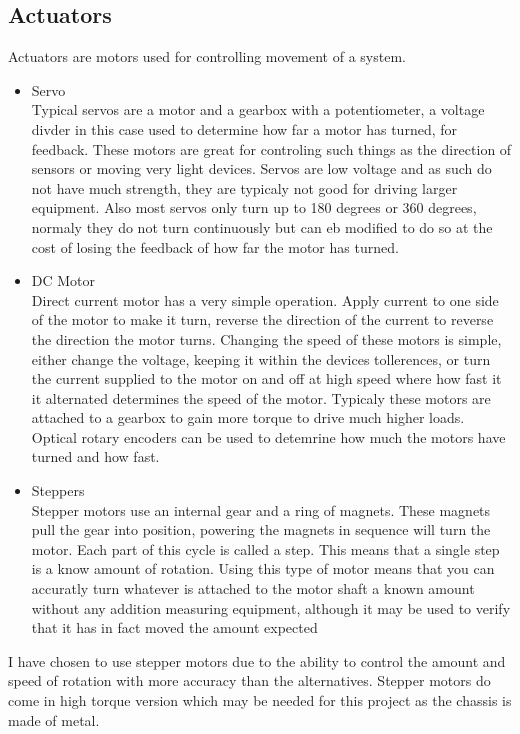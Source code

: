 \subsection{Actuators}
Actuators are motors used for controlling movement of a system.
\begin{itemize}
\item Servo
\\Typical servos are a motor and a gearbox with a potentiometer, a voltage divder in this case used to determine how far a motor has turned, for feedback.  These motors are great for controling such things as the direction of sensors or moving very light devices.  Servos are low voltage and as such do not have much strength, they are typicaly not good for driving larger equipment.  Also most servos only turn up to 180 degrees or 360 degrees, normaly they do not turn continuously but can eb modified to do so at the cost of losing the feedback of how far the motor has turned.

\item DC Motor
\\Direct current motor has a very simple operation.  Apply current to one side of the motor to make it turn, reverse the direction of the current to reverse the direction the motor turns.  Changing the speed of these motors is simple, either change the voltage, keeping it within the devices tollerences, or turn the current supplied to the motor on and off at high speed where how fast it it alternated determines the speed of the motor.  Typicaly these motors are attached to a gearbox to gain more torque to drive much higher loads.  Optical rotary encoders can be used to detemrine how much the motors have turned and how fast.

\item Steppers
\\Stepper motors use an internal gear and a ring of magnets.  These magnets pull the gear into position, powering the magnets in sequence will turn the motor.  Each part of this cycle is called a step.  This means that a single step is a know amount of rotation.  Using this type of motor means that you can accuratly turn whatever is attached to the motor shaft a known amount without any addition measuring equipment, although it may be used to verify that it has in fact moved the amount expected

\end{itemize}

I have chosen to use stepper motors due to the ability to control the amount and speed of rotation with more accuracy than the alternatives.  Stepper motors do come in high torque version which may be needed for this project as the chassis is made of metal.

